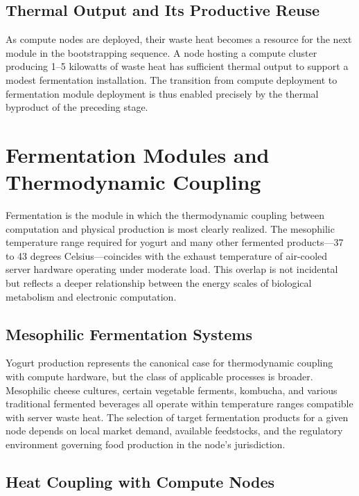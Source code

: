 \documentclass[12pt]{book}
\theoremstyle{definition}
\theoremstyle{remark}
\begin{document}
\section{Thermal Output and Its Productive Reuse}

As compute nodes are deployed, their waste heat becomes a resource
for the next module in the bootstrapping sequence. A node hosting
a compute cluster producing 1--5 kilowatts of waste heat has
sufficient thermal output to support a modest fermentation
installation. The transition from compute deployment to fermentation
module deployment is thus enabled precisely by the thermal
byproduct of the preceding stage.

\chapter{Fermentation Modules and Thermodynamic Coupling}

Fermentation is the module in which the thermodynamic coupling
between computation and physical production is most clearly
realized. The mesophilic temperature range required for yogurt and
many other fermented products---37 to 43 degrees Celsius---coincides
with the exhaust temperature of air-cooled server hardware operating
under moderate load. This overlap is not incidental but reflects a
deeper relationship between the energy scales of biological metabolism
and electronic computation.

\section{Mesophilic Fermentation Systems}

Yogurt production represents the canonical case for thermodynamic
coupling with compute hardware, but the class of applicable processes
is broader. Mesophilic cheese cultures, certain vegetable ferments,
kombucha, and various traditional fermented beverages all operate
within temperature ranges compatible with server waste heat.
The selection of target fermentation products for a given node
depends on local market demand, available feedstocks, and the
regulatory environment governing food production in the node's
jurisdiction.

\section{Heat Coupling with Compute Nodes}
\end{document}
